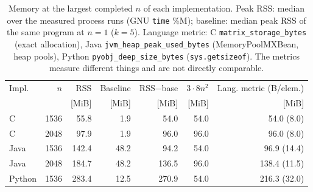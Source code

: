 \begin{table}[t]
\centering
\caption{Memory at the largest completed $n$ of each implementation. Peak RSS: median over the measured process runs (GNU \texttt{time} \%M); baseline: median peak RSS of the same program at $n=1$ ($k=5$). Language metric: C \texttt{matrix\_storage\_bytes} (exact allocation), Java \texttt{jvm\_heap\_peak\_used\_bytes} (MemoryPoolMXBean, heap pools), Python \texttt{pyobj\_deep\_size\_bytes} (\texttt{sys.getsizeof}). The metrics measure different things and are not directly comparable.}
\label{tab:memory}
\footnotesize
\setlength{\tabcolsep}{2.5pt}
\begin{tabular}{@{}lrrrrrr@{}}
\toprule
Impl. & $n$ & RSS & Baseline & RSS$-$base & $3\cdot8n^2$ & Lang. metric (B/elem.) \\
 & & [MiB] & [MiB] & [MiB] & [MiB] & [MiB] \\
\midrule
C & 1536 & 55.8 & 1.9 & 54.0 & 54.0 & 54.0 (8.0) \\
C & 2048 & 97.9 & 1.9 & 96.0 & 96.0 & 96.0 (8.0) \\
Java & 1536 & 142.4 & 48.2 & 94.2 & 54.0 & 96.9 (14.4) \\
Java & 2048 & 184.7 & 48.2 & 136.5 & 96.0 & 138.4 (11.5) \\
Python & 1536 & 283.4 & 12.5 & 270.9 & 54.0 & 216.3 (32.0) \\
\bottomrule
\end{tabular}
\end{table}
